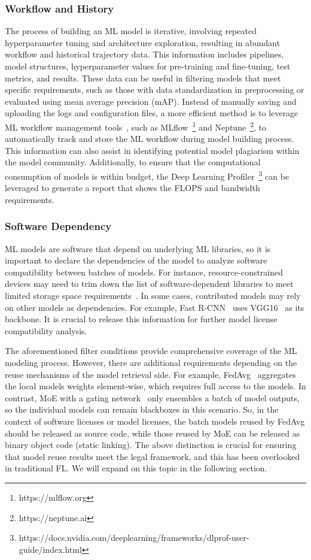 \subsubsection{Workflow and History}
\label{sec:workflow&history}
The process of building an ML model is iterative, involving repeated hyperparameter tuning and architecture exploration, resulting in abundant workflow and historical trajectory data.
This information includes pipelines, model structures, hyperparameter values for pre-training and fine-tuning, test metrics, and results. 
These data can be useful in filtering models that meet specific requirements, such as those with data standardization in preprocessing or evaluated using mean average precision (mAP).
Instead of manually saving and uploading the logs and configuration files, a more efficient method is to leverage ML workflow management tools~\cite{vartak2016modeldb}, such as MLflow~\footnote{https://mlflow.org} and Neptune~\footnote{https://neptune.ai}, to automatically track and store the ML workflow during model building process. 
This information can also assist in identifying potential model plagiarism within the model community.
Additionally, to ensure that the computational consumption of models is within budget, the Deep Learning Profiler~\footnote{https://docs.nvidia.com/deeplearning/frameworks/dlprof-user-guide/index.html} can be leveraged to generate a report that shows the FLOPS and bandwidth requirements.

\subsubsection{Software Dependency}
ML models are software that depend on underlying ML libraries, so it is important to declare the dependencies of the model to analyze software compatibility between batches of models. 
For instance, resource-constrained devices may need to trim down the list of software-dependent libraries to meet limited storage space requirements~\cite{david2021tensorflow}.
In some cases, contributed models may rely on other models as dependencies. 
For example, Fast R-CNN~\cite{girshick2015fast} uses VGG16~\cite{simonyan2014very} as its backbone. 
It is crucial to release this information for further model license compatibility analysis.

The aforementioned filter conditions provide comprehensive coverage of the ML modeling process. 
However, there are additional requirements depending on the reuse mechanisms of the model retrieval side. 
For example, FedAvg~\cite{mcmahan2017communication} aggregates the local models weights element-wise, which requires full access to the models. 
In contrast, MoE with a gating network~\cite{jacobs1991adaptive} only ensembles a batch of model outputs, so the individual models can remain blackboxes in this scenario.
So, in the context of software licenses or model licenses, the batch models reused by FedAvg should be released as source code, while those reused by MoE can be released as binary object code (static linking).
The above distinction is crucial for ensuring that model reuse results meet the legal framework, and this has been overlooked in traditional FL.
We will expand on this topic in the following section.

